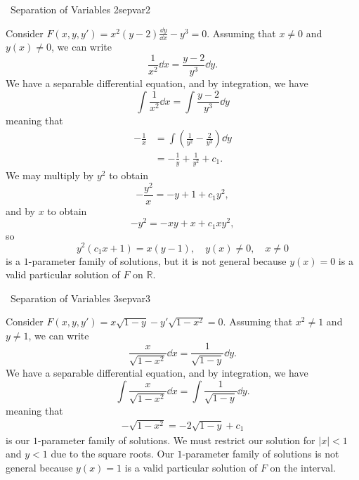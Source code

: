     \begin{example}{\Difficulty\,\Difficulty\,\,Separation of Variables 2}{sepvar2}

        Consider \(F(x,y,y')=x^2(y-2)\frac{\dd y}{\dd x}-y^3=0\). Assuming that \(x\neq0\) and \(y(x)\neq0\), we can write
        \begin{equation*}
            \frac{1}{x^2}\dd x=\frac{y-2}{y^3}\dd y.
        \end{equation*}
        We have a separable differential equation, and by integration, we have
        \begin{equation*}
            \int \frac{1}{x^2}\dd x=\int \frac{y-2}{y^3}\dd y
        \end{equation*}
        meaning that
        \begin{align*}
            -\frac{1}{x}&=\int \left(\frac{1}{y^2}-\frac{2}{y^3} \right)\dd y \\
            &=-\frac{1}{y}+\frac{1}{y^2}+c_1.
        \end{align*}
        We may multiply by \(y^2\) to obtain
        \begin{equation*}
            -\frac{y^2}{x}=-y+1+c_1y^2,
        \end{equation*}
        and by \(x\) to obtain
        \begin{equation*}
            -y^2=-xy+x+c_1xy^2,
        \end{equation*}
        so
        \begin{equation*}
            y^2(c_1x+1)=x(y-1),\quad y(x)\neq 0,\quad x\neq 0
        \end{equation*}
        is a \(1\)-parameter family of solutions, but it is not general because \(y(x)=0\) is a valid particular solution of \(F\) on \(\mathbb{R}\).
    \end{example}

    \pagebreak
    \begin{example}{\Difficulty\,\Difficulty\,\,Separation of Variables 3}{sepvar3}

        Consider \(F(x,y,y')=x\sqrt{1-y}-y'\sqrt{1-x^2}=0\). Assuming that \(x^2\neq 1\) and \(y\neq 1\), we can write
        \begin{equation*}
            \frac{x}{\sqrt{1-x^2}}\dd x=\frac{1}{\sqrt{1-y}}\dd y.
        \end{equation*}
        We have a separable differential equation, and by integration, we have
        \begin{equation*}
            \int \frac{x}{\sqrt{1-x^2}}\dd x=\int \frac{1}{\sqrt{1-y}}\dd y.
        \end{equation*}
        meaning that
        \begin{align*}
            -\sqrt{1-x^2}=-2\sqrt{1-y}+c_1
        \end{align*}
        is our \(1\)-parameter family of solutions. We must restrict our solution for \(|x|<1\) and \(y<1\) due to the square roots. Our \(1\)-parameter family of solutions is not general because \(y(x)=1\) is a valid particular solution of \(F\) on the interval.
        
    \end{example}

